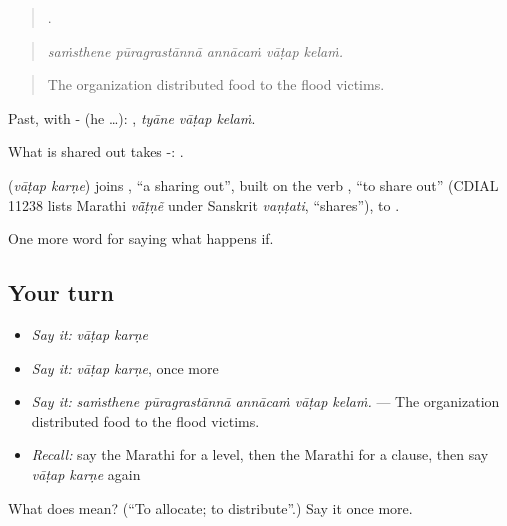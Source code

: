 \begin{quote}
    .
\end{quote}

\begin{quote}
\emph{saṁsthene pūragrastānnā annācaṁ vāṭap kelaṁ.}
\end{quote}

\begin{quote}
The organization distributed food to the flood victims.
\end{quote}

Past, with - (he …):   , \emph{tyāne vāṭap kelaṁ}.

What is shared out takes -:  .

\begin{cousinweb}
\textbf{ } (\emph{vāṭap karṇe}) joins , \textquotedblleft{}a sharing out\textquotedblright{}, built on the verb , \textquotedblleft{}to share out\textquotedblright{} (CDIAL 11238 lists Marathi \emph{vā̃ṭṇẽ} under Sanskrit \emph{vaṇṭati}, \textquotedblleft{}shares\textquotedblright{}), to .
\end{cousinweb}

\begin{grammarlens}[title={What you've built}]
One more word for saying what happens if.
\end{grammarlens}

\subsection*{Your turn}
\begin{itemize}
\raggedright
  \item \emph{Say it:} \emph{vāṭap karṇe}
  \item \emph{Say it:} \emph{vāṭap karṇe}, once more
  \item \emph{Say it:} \emph{saṁsthene pūragrastānnā annācaṁ vāṭap kelaṁ.} — The organization distributed food to the flood victims.
  \item \emph{Recall:} say the Marathi for a level, then the Marathi for a clause, then say \emph{vāṭap karṇe} again
\end{itemize}

\begin{tcolorbox}[breakable,colback=teal!4,colframe=teal!35!black,title={Before you move on}]
What does   mean? (\textquotedblleft{}To allocate; to distribute\textquotedblright{}.) Say it once more.
\end{tcolorbox}

